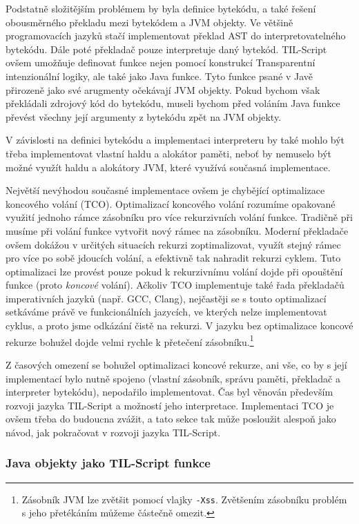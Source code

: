 Podstatně složitějším problémem by byla definice bytekódu, a také řešení obousměrného překladu mezi
bytekódem a JVM objekty. Ve většině programovacích jazyků stačí implementovat překlad AST
do interpretovatelného bytekódu. Dále poté překladač pouze interpretuje daný bytekód. TIL-Script
ovšem umožňuje definovat funkce nejen pomocí konstrukcí Transparentní intenzionální logiky, ale také
jako Java funkce. Tyto funkce psané v Javě přirozeně jako své arugmenty očekávají JVM objekty.
Pokud bychom však překládali zdrojový kód do bytekódu, museli bychom před voláním Java funkce
převést všechny její argumenty z bytekódu zpět na JVM objekty.

V závislosti na definici bytekódu a implementaci interpreteru by také mohlo být třeba implementovat
vlastní haldu a alokátor paměti, neboť by nemuselo být možné využít haldu a alokátory JVM, které
využívá současná implementace.

Největší nevýhodou současné implementace ovšem je chybějící optimalizace koncového volání (TCO).
Optimalizací koncového volání rozumíme opakované využití jednoho rámce zásobníku pro více
rekurzivních volání funkce. Tradičně při musíme při volání funkce vytvořit nový rámec na zásobníku.
Moderní překladače ovšem dokážou v určitých situacích rekurzi zoptimalizovat, využít stejný rámec
pro více po sobě jdoucích volání, a efektivně tak nahradit rekurzi cyklem. Tuto optimalizaci lze
provést pouze pokud k rekurzivnímu volání dojde při opouštění funkce (proto \textit{koncové}
volání). Ačkoliv TCO implementuje také řada překladačů imperativních jazyků (např. GCC, Clang),
nejčastěji se s touto optimalizací setkáváme právě ve funkcionálních jazycích, ve kterých nelze
implementovat cyklus, a proto jsme odkázání čistě na rekurzi. V jazyku bez optimalizace koncové
rekurze bohužel dojde velmi rychle k přetečení zásobníku.\footnote{
  Zásobník JVM lze zvětšit pomocí vlajky \lstinline{-Xss}. Zvětšením zásobníku problém s jeho
  přetékáním můžeme částečně omezit.
}

Z časových omezení se bohužel optimalizaci koncové rekurze, ani vše, co by s její implementací bylo
nutně spojeno (vlastní zásobník, správu paměti, překladač a interpreter bytekódu), nepodařilo
implementovat. Čas byl věnován především rozvoji jazyka TIL-Script a možností jeho interpretace.
Implementaci TCO je ovšem třeba do budoucna zvážit, a tato sekce tak může posloužit alespoň jako
návod, jak pokračovat v rozvoji jazyka TIL-Script.

\subsubsection{Java objekty jako TIL-Script funkce}

